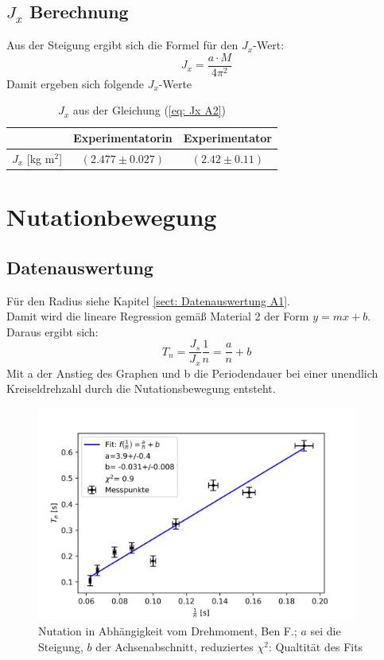 \documentclass[bibliography=totocnumbered]{scrartcl}
\begin{document}
\subsection{$ J_{x} $ Berechnung}
Aus der Steigung ergibt sich die Formel für den $ J_{x} $-Wert:
\begin{equation}\label{eq: Jx A2}
	J_{x}=\dfrac{a\cdot M}{4 \pi ^{2}}
\end{equation}
Damit ergeben sich folgende $ J_{x} $-Werte
\begin{table}[ht!]
	\centering
	\caption[Trägheitsmoment]{$ J_{x} $ aus der Gleichung (\ref{eq: Jx A2})}
	\begin{tabular}{|c|c|c|}
		\hline
		& Experimentatorin & Experimentator \\
		\hline
		$ J_{x} $ [kg m$ ^{2} $]& $ ( 2.477\pm0.027 ) $ & $ (2.42\pm0.11) $ \\
		\hline
	\end{tabular}
	\label{tab: Jx A2}
\end{table}


	
	\section{Nutationbewegung}
	\subsection{Datenauswertung}\label{sect: Datenauswertung A3}
	Für den Radius siehe Kapitel \ref{sect: Datenauswertung A1}.\\
	Damit wird die lineare Regression gemäß Material 2 der Form $ y=mx+b $.
	Daraus ergibt sich:
	\begin{equation}\label{eq: Tn A3}
		T_{n}=\dfrac{J_{s}}{J_{x}}\dfrac{1}{n}=\dfrac{a}{n}+b
	\end{equation}
	Mit a der Anstieg des Graphen und b die Periodendauer bei einer unendlich Kreiseldrehzahl durch die Nutationsbewegung entsteht.
	
	
	\begin{figure}[!ht]
		\centering								 
		\includegraphics[width=300pt]{fotos/gpr1/B_A3.png}
		\caption[Nutation in Abhängigkeit der Kreisdrehzahl]{Nutation in Abhängigkeit vom Drehmoment, Ben F.; $ a $ sei die Steigung, $ b $ der Achsenabschnitt, reduziertes $ \chi^{2} $: Qualtität des Fits}							 
		\label{Abb: A3}							 
	\end{figure}
	
\end{document}
